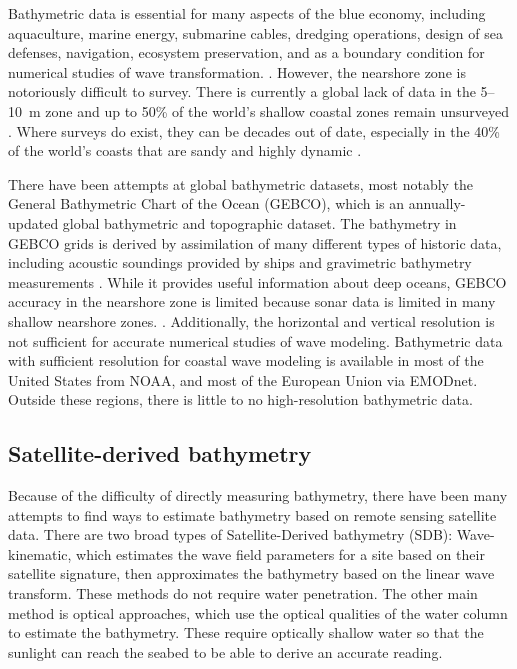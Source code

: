 Bathymetric data is essential for many aspects of the blue economy, including aquaculture, marine energy, submarine cables, dredging operations, design of sea defenses, navigation, ecosystem preservation, and as a boundary condition for numerical studies of wave transformation. \parencite{Cesbron2021,Ashphaq2021}. However, the nearshore zone is notoriously difficult to survey. There is currently a global lack of data in the 5--10~m zone \parencite{Albright2021} and up to 50\% of the world's shallow coastal zones remain unsurveyed \parencite{IHO/OHI2022}. Where surveys do exist, they can be decades out of date, especially in the 40\% of the world's coasts that are sandy and highly dynamic \parencite{Almar2021e}.

There have been attempts at global bathymetric datasets, most notably the General Bathymetric Chart of the Ocean (GEBCO), which is an annually-updated global bathymetric and topographic dataset. The bathymetry in GEBCO grids is derived by assimilation of many different types of historic data, including  acoustic soundings provided by ships and gravimetric bathymetry measurements \parencite{Cesbron2021}. While it provides useful information about deep oceans, GEBCO accuracy in the nearshore zone is limited because sonar data is limited in many shallow nearshore zones. \parencite{Monteys2015}. Additionally, the horizontal and vertical resolution is not sufficient for accurate numerical studies of wave modeling. Bathymetric data with sufficient resolution for coastal wave modeling is available in most of the United States from NOAA, and most of the European Union via EMODnet. Outside these regions, there is little to no high-resolution bathymetric data. 

\subsection{Satellite-derived bathymetry}

Because of the difficulty of directly measuring bathymetry, there have been many attempts to find ways to estimate bathymetry based on remote sensing satellite data. There are two broad types of Satellite-Derived bathymetry (SDB): Wave-kinematic, which estimates the wave field parameters for a site based on their satellite signature, then approximates the bathymetry based on the linear wave transform. These methods do not require water penetration. The other main method is optical approaches, which use the optical qualities of the water column to estimate the bathymetry. These require optically shallow water so that the sunlight can reach the seabed to be able to derive an accurate reading. 


